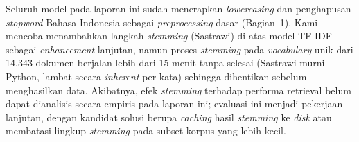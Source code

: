 \documentclass[10pt,a4paper]{article}
\begin{document}
Seluruh model pada laporan ini sudah menerapkan \emph{lowercasing} dan penghapusan \emph{stopword} Bahasa Indonesia sebagai \emph{preprocessing} dasar (Bagian~1). Kami mencoba menambahkan langkah \emph{stemming} (Sastrawi) di atas model TF-IDF sebagai \emph{enhancement} lanjutan, namun proses \emph{stemming} pada \emph{vocabulary} unik dari 14.343 dokumen berjalan lebih dari 15 menit tanpa selesai (Sastrawi murni Python, lambat secara \emph{inherent} per kata) sehingga dihentikan sebelum menghasilkan data. Akibatnya, efek \emph{stemming} terhadap performa retrieval belum dapat dianalisis secara empiris pada laporan ini; evaluasi ini menjadi pekerjaan lanjutan, dengan kandidat solusi berupa \emph{caching} hasil \emph{stemming} ke \emph{disk} atau membatasi lingkup \emph{stemming} pada subset korpus yang lebih kecil.
\end{document}
